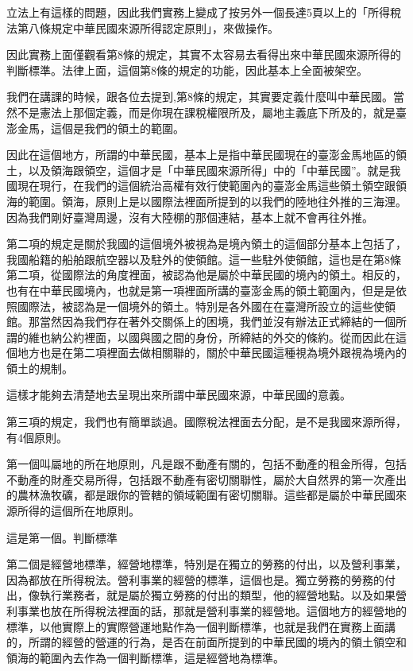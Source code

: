 \documentclass[]{ctexbook}
\begin{document}
立法上有這樣的問題，因此我們實務上變成了按另外一個長達5頁以上的「所得稅法第八條規定中華民國來源所得認定原則」，來做操作。

因此實務上面僅觀看第8條的規定，其實不太容易去看得出來中華民國來源所得的判斷標準。法律上面，這個第8條的規定的功能，因此基本上全面被架空。

我們在講課的時候，跟各位去提到,第8條的規定，其實要定義什麼叫中華民國。當然不是憲法上那個定義，而是你現在課稅權限所及，屬地主義底下所及的，就是臺澎金馬，這個是我們的領土的範圍。

因此在這個地方，所謂的中華民國，基本上是指中華民國現在的臺澎金馬地區的領土，以及領海跟領空，這個才是「中華民國來源所得」中的「中華民國''。就是我國現在現行，在我們的這個統治高權有效行使範圍內的臺澎金馬這些領土領空跟領海的範圍。領海，原則上是以國際法裡面所提到的以我們的陸地往外推的三海浬。因為我們剛好臺灣周邊，沒有大陸棚的那個連結，基本上就不會再往外推。

第二項的規定是關於我國的這個境外被視為是境內領土的這個部分基本上包括了，我國船籍的船舶跟航空器以及駐外的使領館。這一些駐外使領館，這也是在第8條第二項，從國際法的角度裡面，被認為他是屬於中華民國的境內的領土。相反的，也有在中華民國境內，也就是第一項裡面所講的臺澎金馬的領土範圍內，但是是依照國際法，被認為是一個境外的領土。特別是各外國在在臺灣所設立的這些使領館。那當然因為我們存在著外交關係上的困境，我們並沒有辦法正式締結的一個所謂的維也納公約裡面，以國與國之間的身份，所締結的外交的條約。從而因此在這個地方也是在第二項裡面去做相關聯的，關於中華民國這種視為境外跟視為境內的領土的規制。

這樣才能夠去清楚地去呈現出來所謂中華民國來源，中華民國的意義。

第三項的規定，我們也有簡單談過。國際稅法裡面去分配，是不是我國來源所得，有4個原則。

第一個叫屬地的所在地原則，凡是跟不動產有關的，包括不動產的租金所得，包括不動產的財產交易所得，包括跟不動產有密切關聯性，屬於大自然界的第一次產出的農林漁牧礦，都是跟你的管轄的領域範圍有密切關聯。這些都是屬於中華民國來源所得的這個所在地原則。

這是第一個。判斷標準

第二個是經營地標準，經營地標準，特別是在獨立的勞務的付出，以及營利事業，因為都放在所得稅法。營利事業的經營的標準，這個也是。獨立勞務的勞務的付出，像執行業務者，就是屬於獨立勞務的付出的類型，他的經營地點。以及如果營利事業也放在所得稅法裡面的話，那就是營利事業的經營地。這個地方的經營地的標準，以他實際上的實際營運地點作為一個判斷標準，也就是我們在實務上面講的，所謂的經營的營運的行為，是否在前面所提到的中華民國的境內的領土領空和領海的範圍內去作為一個判斷標準，這是經營地為標準。
\end{document}
